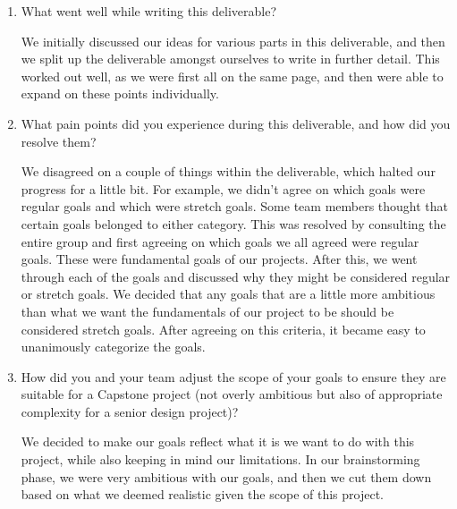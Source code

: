 \documentclass{article}
\begin{document}
\begin{enumerate}
    \item What went well while writing this deliverable? 
    
    We initially discussed our ideas for various parts in this deliverable, and then we split up the deliverable amongst ourselves to write in further detail. This worked out well, as we were first all on the same page, and then were able to expand on these points individually. \\
    
    \item What pain points did you experience during this deliverable, and how
    did you resolve them?
    
    We disagreed on a couple of things within the deliverable, which halted our progress for a little bit. For example, we didn't agree on which goals were regular goals and which were stretch goals. Some team members thought that certain goals belonged to either category. This was resolved by consulting the entire group and first agreeing on which goals we all agreed were regular goals. These were fundamental goals of our projects. After this, we went through each of the goals and discussed why they might be considered regular or stretch goals. We decided that any goals that are a little more ambitious than what we want the fundamentals of our project to be should be considered stretch goals. After agreeing on this criteria, it became easy to unanimously categorize the goals.\\
    
    \item How did you and your team adjust the scope of your goals to ensure
    they are suitable for a Capstone project (not overly ambitious but also of
    appropriate complexity for a senior design project)? 
    
    We decided to make our goals reflect what it is we want to do with this project, while also keeping in mind our limitations. In our brainstorming phase, we were very ambitious with our goals, and then we cut them down based on what we deemed realistic given the scope of this project.\\
    
\end{enumerate}  
\end{document}
